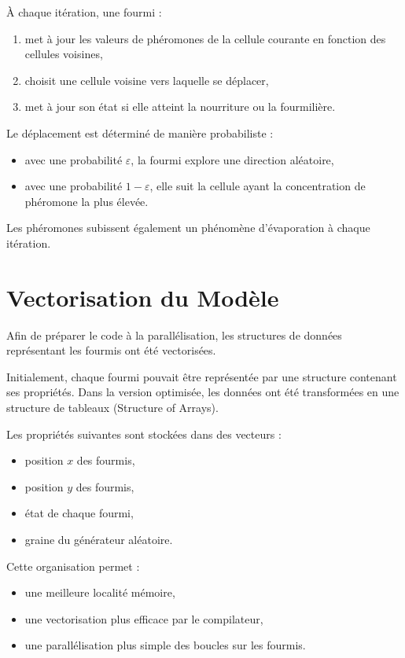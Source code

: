 \documentclass[12pt, a4paper]{article}
\begin{document}
À chaque itération, une fourmi :

\begin{enumerate}
\item met à jour les valeurs de phéromones de la cellule courante en fonction des cellules voisines,
\item choisit une cellule voisine vers laquelle se déplacer,
\item met à jour son état si elle atteint la nourriture ou la fourmilière.
\end{enumerate}

Le déplacement est déterminé de manière probabiliste :

\begin{itemize}
\item avec une probabilité $\varepsilon$, la fourmi explore une direction aléatoire,
\item avec une probabilité $1-\varepsilon$, elle suit la cellule ayant la concentration de phéromone la plus élevée.
\end{itemize}

Les phéromones subissent également un phénomène d’évaporation à chaque itération.

\section{Vectorisation du Modèle}

Afin de préparer le code à la parallélisation, les structures de données représentant les fourmis ont été vectorisées.

Initialement, chaque fourmi pouvait être représentée par une structure contenant ses propriétés. Dans la version optimisée, les données ont été transformées en une structure de tableaux (Structure of Arrays).

Les propriétés suivantes sont stockées dans des vecteurs :

\begin{itemize}
\item position $x$ des fourmis,
\item position $y$ des fourmis,
\item état de chaque fourmi,
\item graine du générateur aléatoire.
\end{itemize}

Cette organisation permet :

\begin{itemize}
\item une meilleure localité mémoire,
\item une vectorisation plus efficace par le compilateur,
\item une parallélisation plus simple des boucles sur les fourmis.
\end{itemize}
\end{document}
